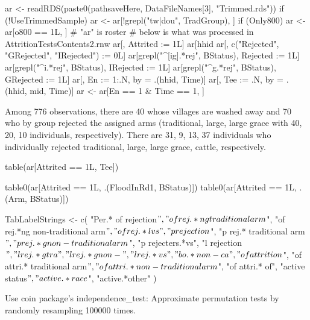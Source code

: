 \begin{Schunk}
\begin{Sinput}
ar <- readRDS(paste0(pathsaveHere, DataFileNames[3], "Trimmed.rds"))
if (!UseTrimmedSample) ar <- ar[!grepl("tw|dou", TradGroup), ]
if (Only800) ar <- ar[o800 == 1L, ]
# "ar" is roster
# below is what was processed in AttritionTestsContents2.rnw
ar[, Attrited := 1L]
ar[hhid %
ar[, c("Rejected", "GRejected", "IRejected") := 0L]
ar[grepl("^[ig].*rej", BStatus), Rejected := 1L]
ar[grepl("^i.*rej", BStatus), IRejected := 1L]
ar[grepl("^g.*rej", BStatus), GRejected := 1L]
ar[, En := 1:.N, by = .(hhid, Time)]
ar[, Tee := .N, by = .(hhid, mid, Time)]
ar <- ar[En == 1 & Time == 1, ]
\end{Sinput}
\end{Schunk}
Among 776 observations, there are 40 whose villages are washed away and 70 who by group rejected the assigned arms (traditional, large, large grace with 40, 20, 10 individuals, respectively). There are 31, 9, 13, 37 individuals who individually rejected traditional, large, large grace, cattle, respectively. %
\begin{Schunk}
\begin{Sinput}
table(ar[Attrited == 1L, Tee])
\end{Sinput}
\end{Schunk}
\begin{Schunk}
\begin{Sinput}
table0(ar[Attrited == 1L, .(FloodInRd1, BStatus)])
table0(ar[Attrited == 1L, .(Arm, BStatus)])
\end{Sinput}
\end{Schunk}
\begin{Schunk}
\begin{Sinput}
TabLabelStrings <- 
c(
  "Per.* of rejection$", "of rej.*ng traditional arm$", "of rej.*ng non-traditional arm$", 
  "of rej.*l vs", "p rejection$", "p rej.* traditional arm$", 
  "p rej.*g non-traditional arm$", "p rejecters.*vs", "l rejection$", 
  "l rej.*g tra",  "l rej.*g non-", "l rej.*vs", 
  "bo.*non-ca", 
  "of attrition$", "of attri.* traditional arm$", 
  "of attri.* non-traditional arm$", "of attri.* of",
  "active status$", "active.*race$", "active.*other"
  )
\end{Sinput}
\end{Schunk}
Use \textsf{coin} package's \textsf{independence\_test}: Approximate permutation tests by randomly resampling 100000 times.

